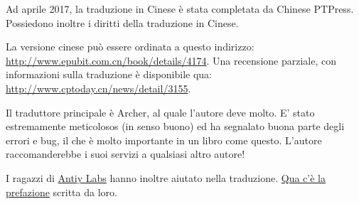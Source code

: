 Ad aprile 2017, la traduzione in Cinese è stata completata da Chinese PTPress. Possiedono inoltre i diritti della traduzione in Cinese.

La versione cinese può essere ordinata a questo indirizzo: \url{http://www.epubit.com.cn/book/details/4174}. Una recensione parziale, con informazioni sulla traduzione è disponibile qua: \url{http://www.cptoday.cn/news/detail/3155}.

Il traduttore principale è Archer, al quale l'autore deve molto. E' stato estremamente meticolosos (in senso buono) ed ha segnalato buona parte degli errori e bug, il che è molto importante in un libro come questo.
L'autore raccomanderebbe i suoi servizi a qualsiasi altro autore!

I ragazzi di \href{http://www.antiy.net/}{Antiy Labs} hanno inoltre aiutato nella traduzione. \href{http://www.epubit.com.cn/book/onlinechapter/51413}{Qua c'è la prefazione} scritta da loro.
